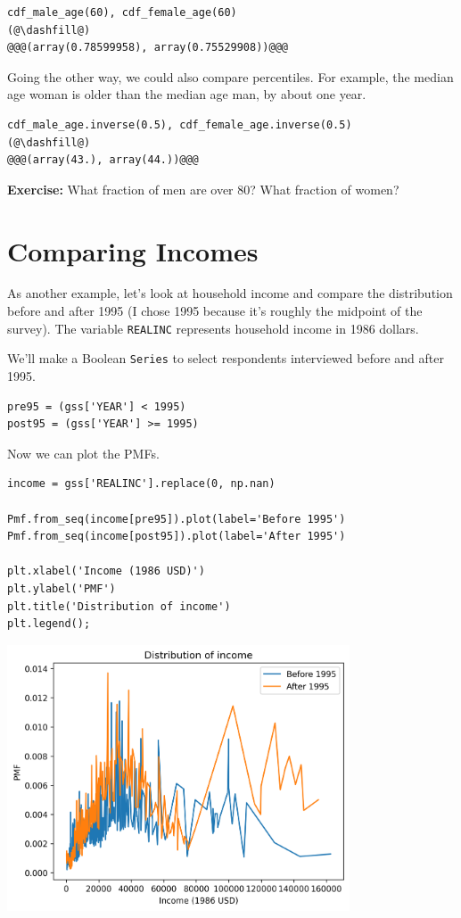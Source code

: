\begin{lstlisting}[]
cdf_male_age(60), cdf_female_age(60)
(@\dashfill@)
@@@(array(0.78599958), array(0.75529908))@@@
\end{lstlisting}

Going the other way, we could also compare percentiles. For example, the
median age woman is older than the median age man, by about one year.

\begin{lstlisting}[]
cdf_male_age.inverse(0.5), cdf_female_age.inverse(0.5)
(@\dashfill@)
@@@(array(43.), array(44.))@@@
\end{lstlisting}

\textbf{Exercise:} What fraction of men are over 80? What fraction of
women?

\hypertarget{comparing-incomes}{%
\section{Comparing Incomes}\label{comparing-incomes}}

As another example, let's look at household income and compare the
distribution before and after 1995 (I chose 1995 because it's roughly
the midpoint of the survey). The variable
\passthrough{\lstinline!REALINC!} represents household income in 1986
dollars.

We'll make a Boolean \passthrough{\lstinline!Series!} to select
respondents interviewed before and after 1995.

\begin{lstlisting}[]
pre95 = (gss['YEAR'] < 1995)
post95 = (gss['YEAR'] >= 1995)
\end{lstlisting}

Now we can plot the PMFs.

\begin{lstlisting}[]
income = gss['REALINC'].replace(0, np.nan)

Pmf.from_seq(income[pre95]).plot(label='Before 1995')
Pmf.from_seq(income[post95]).plot(label='After 1995')

plt.xlabel('Income (1986 USD)')
plt.ylabel('PMF')
plt.title('Distribution of income')
plt.legend();
\end{lstlisting}

\begin{center}
\includegraphics[width=4in]{chapters/08_distributions_files/08_distributions_99_0.png}
\end{center}

